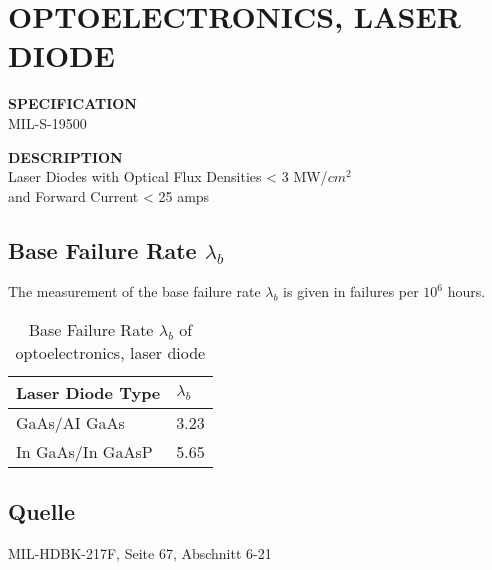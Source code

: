 \section{OPTOELECTRONICS, LASER DIODE}

\begin{minipage}[t]{0.29\textwidth}
    \textbf{SPECIFICATION}\\
    MIL-S-19500
\end{minipage}
\begin{minipage}[t]{0.7\textwidth}
    \textbf{DESCRIPTION}\\
    {\fontsize{12pt}{12pt}\selectfont Laser Diodes with Optical Flux Densities < 3 MW/$cm^2$ \\and Forward Current < 25 amps}
\end{minipage}

\subsection{Base Failure Rate $\lambda_b$}
The measurement of the base failure rate $\lambda_b$ is given in failures per $10^6$ hours.
\begin{table}[ht]
{\centering

\begin{tabular}{|p{7.5cm}|p{5cm}|}
    \hline
    \textbf{Laser Diode Type} & \textbf{$\lambda_b$} \\
    \hline
    GaAs/AI GaAs & 3.23 \\
    \hline
    In GaAs/In GaAsP & 5.65\\
    \hline
\end{tabular}

\caption{Base Failure Rate $\lambda_b$ of optoelectronics, laser diode}

\label{tab:bfr_optoelectronics_laser_diode}
\par}
\subsection*{Quelle}
MIL-HDBK-217F, Seite 67, Abschnitt 6-21
\end{table}